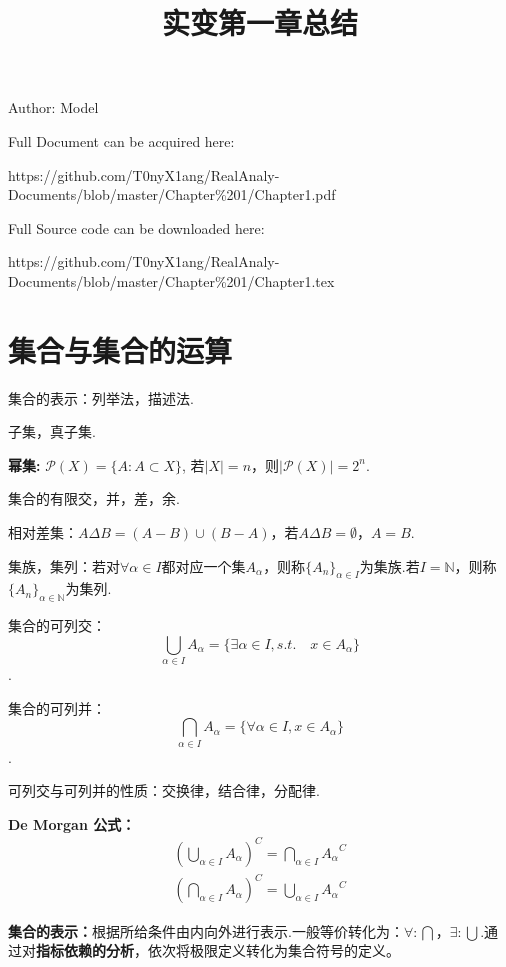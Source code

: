 \documentclass[bwprint, withoutpreface]{cumcmthesis}
\title{实变第一章总结}
\begin{document}
\maketitle
\noindent Author: Model

\noindent Full Document can be acquired here: 

\noindent https://github.com/T0nyX1ang/RealAnaly-Documents/blob/master/Chapter\%201/Chapter1.pdf

\noindent Full Source code can be downloaded here:

\noindent https://github.com/T0nyX1ang/RealAnaly-Documents/blob/master/Chapter\%201/Chapter1.tex

\section{集合与集合的运算}
\indent 集合的表示：列举法，描述法.

子集，真子集.

\textbf{幂集:} $\mathcal{P}(X) = \{A:A \subset X\}$, 若$|X|=n$，则$|\mathcal{P}(X)|=2^n$.

集合的有限交，并，差，余.

相对差集：$A \Delta B = (A - B) \cup (B - A)$，若$A \Delta B = \emptyset$，$A = B$.

集族，集列：若对$\forall \alpha \in I$都对应一个集$A_{\alpha}$，则称$\{A_n\}_{\alpha \in I}$为集族.若$I = \mathbb{N}$，则称$\{A_n\}_{\alpha \in \mathbb{N}}$为集列.

集合的可列交：
\begin{equation*}
	\bigcup_{\alpha \in I}{A_\alpha} = \{\exists \alpha \in I, s.t. \quad x \in A_{\alpha}\}
\end{equation*}.

集合的可列并：
\begin{equation*}
	\bigcap_{\alpha \in I}{A_\alpha} = \{\forall \alpha \in I, x \in A_{\alpha}\}
\end{equation*}.

可列交与可列并的性质：交换律，结合律，分配律.

\textbf{De Morgan 公式：}
\begin{align*}
	{(\bigcup_{\alpha \in I}{A_{\alpha}})}^C = \bigcap_{\alpha \in I}{{A_{\alpha}}^C} \\ 
	{(\bigcap_{\alpha \in I}{A_{\alpha}})}^C = \bigcup_{\alpha \in I}{{A_{\alpha}}^C}
\end{align*}

\textbf{集合的表示：}根据所给条件由内向外进行表示.一般等价转化为：$\forall: \bigcap$，$\exists: \bigcup$.通过对\textbf{指标依赖的分析}，依次将极限定义转化为集合符号的定义。
\end{document}

